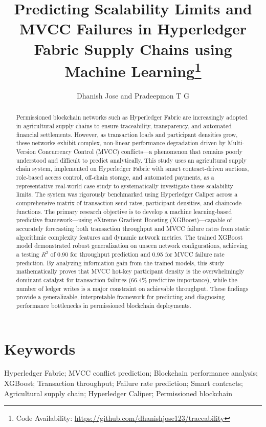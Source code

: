 \documentclass[12pt]{article}
\title{Predicting Scalability Limits and MVCC Failures in Hyperledger Fabric Supply Chains using Machine Learning\thanks{Code Availability: \url{https://github.com/dhanishjose123/traceability}}}
\author{Dhanish Jose and Pradeepmon T G}
\affil{Department of Mechanical Engineering, National Institute of Technology Calicut, India}
\date{}
\begin{document}
	
	\maketitle
		\begin{abstract}
		Permissioned blockchain networks such as Hyperledger Fabric are increasingly adopted in agricultural supply chains to ensure traceability, transparency, and automated financial settlements. However, as transaction loads and participant densities grow, these networks exhibit complex, non-linear performance degradation driven by Multi-Version Concurrency Control (MVCC) conflicts—a phenomenon that remains poorly understood and difficult to predict analytically. This study uses an agricultural supply chain system, implemented on Hyperledger Fabric with smart contract-driven auctions, role-based access control, off-chain storage, and automated payments, as a representative real-world case study to systematically investigate these scalability limits. The system was rigorously benchmarked using Hyperledger Caliper across a comprehensive matrix of transaction send rates, participant densities, and chaincode functions. The primary research objective is to develop a machine learning-based predictive framework—using eXtreme Gradient Boosting (XGBoost)—capable of accurately forecasting both transaction throughput and MVCC failure rates from static algorithmic complexity features and dynamic network metrics. The trained XGBoost model demonstrated robust generalization on unseen network configurations, achieving a testing $R^2$ of 0.90 for throughput prediction and 0.95 for MVCC failure rate prediction. By analyzing information gain from the trained models, this study mathematically proves that MVCC hot-key participant density is the overwhelmingly dominant catalyst for transaction failures (66.4\% predictive importance), while the number of ledger writes is a major constraint on achievable throughput. These findings provide a generalizable, interpretable framework for predicting and diagnosing performance bottlenecks in permissioned blockchain deployments.
	\end{abstract}
	
	
	
	
	
	\section*{Keywords}
	Hyperledger Fabric; MVCC conflict prediction; Blockchain performance analysis; 
	XGBoost; Transaction throughput; Failure rate prediction; Smart contracts; 
	Agricultural supply chain; Hyperledger Caliper; Permissioned blockchain
	
\end{document}
